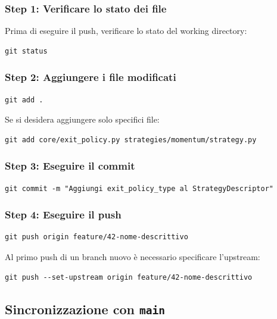 \subsubsection{Step 1: Verificare lo stato dei file}

Prima di eseguire il push, verificare lo stato del working directory:

\begin{lstlisting}
git status
\end{lstlisting}

\subsubsection{Step 2: Aggiungere i file modificati}

\begin{lstlisting}
git add .
\end{lstlisting}

Se si desidera aggiungere solo specifici file:

\begin{lstlisting}
git add core/exit_policy.py strategies/momentum/strategy.py
\end{lstlisting}

\subsubsection{Step 3: Eseguire il commit}

\begin{lstlisting}
git commit -m "Aggiungi exit_policy_type al StrategyDescriptor"
\end{lstlisting}

\subsubsection{Step 4: Eseguire il push}

\begin{lstlisting}
git push origin feature/42-nome-descrittivo
\end{lstlisting}

Al primo push di un branch nuovo è necessario specificare l'upstream:

\begin{lstlisting}
git push --set-upstream origin feature/42-nome-descrittivo
\end{lstlisting}

\subsection{Sincronizzazione con \texttt{main}}

